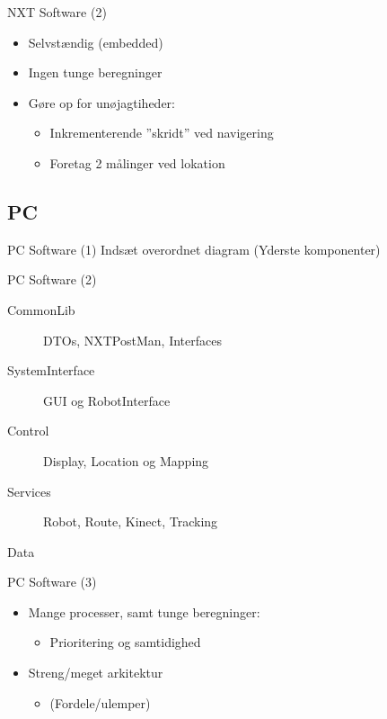 \begin{frame}{NXT Software (2)}
\begin{itemize}
\item{Selvstændig (embedded)}
\item{Ingen tunge beregninger}
\item{Gøre op for unøjagtiheder:}
\begin{itemize}
\item{Inkrementerende ''skridt'' ved navigering}
\item{Foretag 2 målinger ved lokation}
\end{itemize}
\end{itemize}
\end{frame}

\subsection{PC}

\begin{frame}{PC Software (1)}
Indsæt overordnet diagram (Yderste komponenter)
\end{frame}

\begin{frame}{PC Software (2)}
\begin{description}
\item[CommonLib]{DTOs, NXTPostMan, Interfaces}
\item[SystemInterface]{GUI og RobotInterface}
\item[Control]{Display, Location og Mapping}
\item[Services]{Robot, Route, Kinect, Tracking}
\item[Data]
\end{description}
\end{frame}

\begin{frame}{PC Software (3)}
\begin{itemize}
\item{Mange processer, samt tunge beregninger:}
\begin{itemize}
\item{Prioritering og samtidighed}
\end{itemize}
\item{Streng/meget arkitektur}
\begin{itemize}
\item{(Fordele/ulemper)}
\end{itemize}
\end{itemize}
\end{frame}

